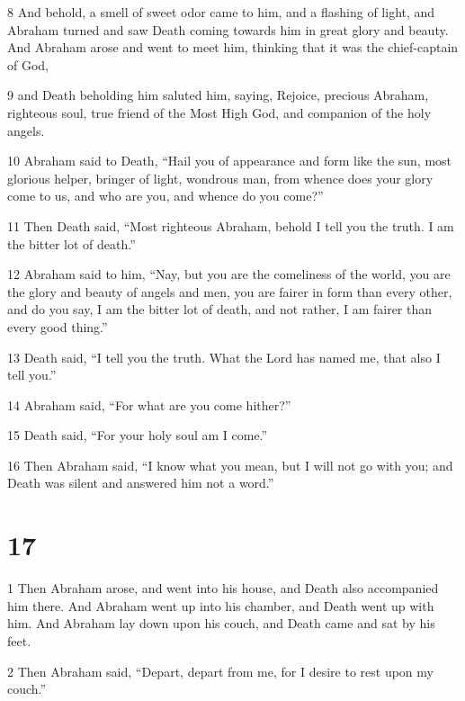\par 8 And behold, a smell of sweet odor came to him, and a flashing of light, and Abraham turned and saw Death coming towards him in great glory and beauty. And Abraham arose and went to meet him, thinking that it was the chief-captain of God, 

\par 9 and Death beholding him saluted him, saying, Rejoice, precious Abraham, righteous soul, true friend of the Most High God, and companion of the holy angels. 

\par 10 Abraham said to Death, “Hail you of appearance and form like the sun, most glorious helper, bringer of light, wondrous man, from whence does your glory come to us, and who are you, and whence do you come?” 

\par 11 Then Death said, “Most righteous Abraham, behold I tell you the truth. I am the bitter lot of death.” 

\par 12 Abraham said to him, “Nay, but you are the comeliness of the world, you are the glory and beauty of angels and men, you are fairer in form than every other, and do you say, I am the bitter lot of death, and not rather, I am fairer than every good thing.” 

\par 13 Death said, “I tell you the truth. What the Lord has named me, that also I tell you.” 

\par 14 Abraham said, “For what are you come hither?” 

\par 15 Death said, “For your holy soul am I come.” 

\par 16 Then Abraham said, “I know what you mean, but I will not go with you; and Death was silent and answered him not a word.”

\chapter{17}

\par 1 Then Abraham arose, and went into his house, and Death also accompanied him there. And Abraham went up into his chamber, and Death went up with him. And Abraham lay down upon his couch, and Death came and sat by his feet. 

\par 2 Then Abraham said, “Depart, depart from me, for I desire to rest upon my couch.” 

